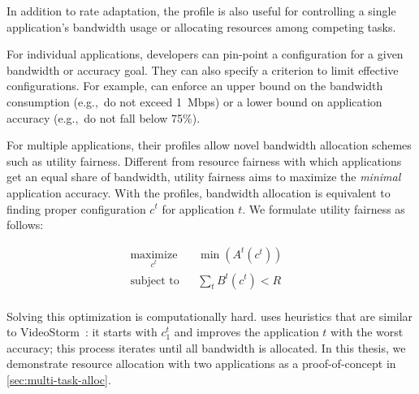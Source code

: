In addition to rate adaptation, the profile is also useful for controlling a
single application's bandwidth usage or allocating resources among competing
tasks.

For individual applications, developers can pin-point a configuration for a
given bandwidth or accuracy goal. They can also specify a criterion to limit
effective configurations. For example, \awstream{} can enforce an upper bound on
the bandwidth consumption (e.g.,~do not exceed \SI{1}{Mbps}) or a lower bound on
application accuracy (e.g.,~do not fall below 75\%).

For multiple applications, their profiles allow novel bandwidth allocation
schemes such as utility fairness. Different from resource fairness with which
applications get an equal share of bandwidth, utility fairness aims to maximize
the \textit{minimal} application accuracy. With the profiles, bandwidth
allocation is equivalent to finding proper configuration $c^t$ for application
$t$. We formulate utility fairness as follows:



\begin{equation}
 \label{eq:multitask}
 \begin{aligned}
    & \underset{c^t}{\text{maximize}} & & \min({A^t(c^t)}) & & \\
    & \text{subject to} & & \sum_t{B^t(c^t)} < R & & \\
 \end{aligned}
\end{equation}

Solving this optimization is computationally hard. \awstream{} uses heuristics
that are similar to VideoStorm~\cite{zhang2017live}: it starts with $c^t_1$ and
improves the application $t$ with the worst accuracy; this process iterates
until all bandwidth is allocated. In this thesis, we demonstrate resource
allocation with two applications as a proof-of-concept in
\autoref{sec:multi-task-alloc}.


